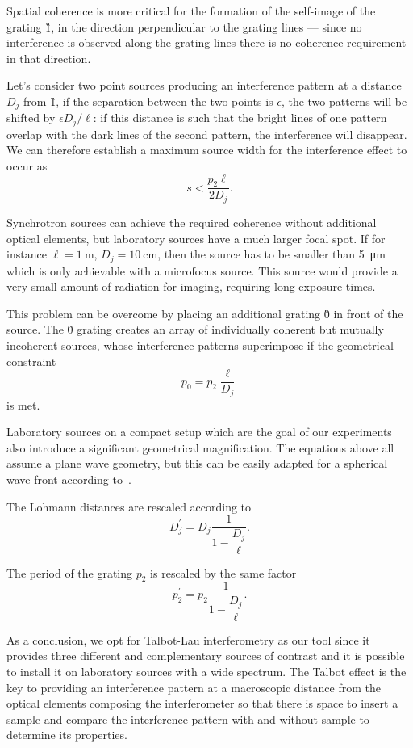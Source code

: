 Spatial coherence is more critical for the formation of the self-image of
the grating \G1, in the direction perpendicular to the grating lines --- since no
interference is observed along the grating lines there
is no coherence requirement in that direction.

Let's consider two point sources producing an interference pattern at a
distance $D_j$ from \G1, if the separation between the two points is
$\epsilon$, the two patterns will be shifted by $\epsilon D_j / \ell$: if
this distance is such that the bright lines of one pattern
overlap with the dark lines of the second pattern, the interference will
disappear. We can therefore establish a maximum source width for the
interference effect to occur as
\begin{equation}
    s < \frac{p_2\ell}{2D_j}.
    \label{eq:source.size}
\end{equation}

Synchrotron sources can achieve the required coherence without additional
optical elements, but laboratory sources have a much larger focal spot. If
for instance $\ell = \SI{1}{\meter}$, $D_j = \SI{10}{\centi\meter}$, then
the source has to be smaller than \SI{5}{\micro\meter} which is only
achievable with a microfocus source. This source would provide a very small
amount of radiation for imaging, requiring long exposure times.

This problem can be overcome by placing an additional grating \G0 in front
of the source. The \G0 grating creates an array of individually coherent but
mutually incoherent sources, whose interference patterns superimpose if the
geometrical constraint
\begin{equation}
    p_0 = p_2 \frac{\ell}{D_j}\label{eq:p0}
\end{equation}
is met.

Laboratory sources on a compact setup which are the goal of our experiments
also introduce a significant geometrical magnification. The equations above
all assume a plane wave geometry, but this can be easily adapted for a
spherical wave front according to~\cite{Engelhardt2008}.

The Lohmann distances are rescaled according to
\begin{equation}
    D_j^\prime = D_j \frac{1}{1 -
        \dfrac{D_j}{\ell}}.\label{eq:magnification-distance}
\end{equation}

The period of the grating $p_2$ is rescaled by the same factor
\begin{equation}
    p_2^\prime = p_2 \frac{1}{1 -
        \dfrac{D_j}{\ell}}.\label{eq:magnification}
\end{equation}

As a conclusion, we opt for Talbot-Lau interferometry as our tool since it
provides three different and complementary sources of contrast and it is
possible to install it on laboratory sources with a wide spectrum. The
Talbot effect is the key to providing an interference pattern at a
macroscopic distance from the optical elements composing the interferometer
so that there is space to insert a sample and compare the interference
pattern with and without sample to determine its properties.
